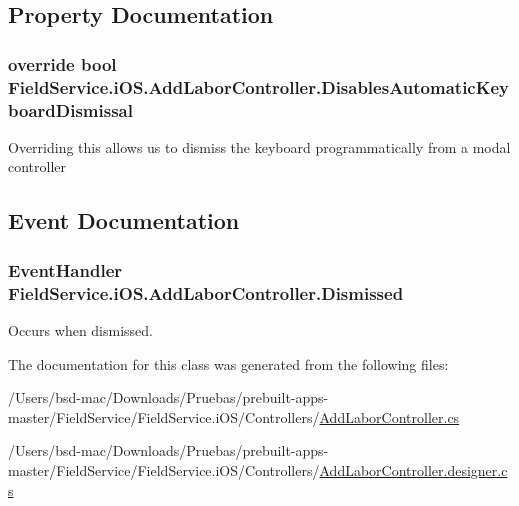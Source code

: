 \subsection{Property Documentation}
\hypertarget{class_field_service_1_1i_o_s_1_1_add_labor_controller_a2211be478c0790650388b8394d2e37cd}{
\subsubsection[{Disables\+Automatic\+Keyboard\+Dismissal}]{\setlength{\rightskip}{0pt plus 5cm}override bool Field\+Service.\+i\+O\+S.\+Add\+Labor\+Controller.\+Disables\+Automatic\+Keyboard\+Dismissal\hspace{0.3cm}{\ttfamily [get]}}}\label{class_field_service_1_1i_o_s_1_1_add_labor_controller_a2211be478c0790650388b8394d2e37cd}


Overriding this allows us to dismiss the keyboard programmatically from a modal controller 



\subsection{Event Documentation}
\hypertarget{class_field_service_1_1i_o_s_1_1_add_labor_controller_acdd338bdb7162e462d1b4317b9a0cf6d}{
\subsubsection[{Dismissed}]{\setlength{\rightskip}{0pt plus 5cm}Event\+Handler Field\+Service.\+i\+O\+S.\+Add\+Labor\+Controller.\+Dismissed}}\label{class_field_service_1_1i_o_s_1_1_add_labor_controller_acdd338bdb7162e462d1b4317b9a0cf6d}


Occurs when dismissed. 



The documentation for this class was generated from the following files\+:\begin{DoxyCompactItemize}
\item 
/\+Users/bsd-\/mac/\+Downloads/\+Pruebas/prebuilt-\/apps-\/master/\+Field\+Service/\+Field\+Service.\+i\+O\+S/\+Controllers/\hyperlink{_add_labor_controller_8cs}{Add\+Labor\+Controller.\+cs}\item 
/\+Users/bsd-\/mac/\+Downloads/\+Pruebas/prebuilt-\/apps-\/master/\+Field\+Service/\+Field\+Service.\+i\+O\+S/\+Controllers/\hyperlink{_add_labor_controller_8designer_8cs}{Add\+Labor\+Controller.\+designer.\+cs}\end{DoxyCompactItemize}
